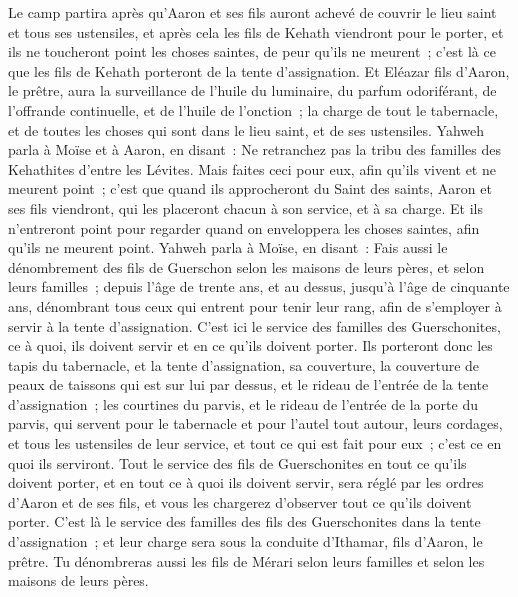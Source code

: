 \begin{multicols}{2}
Le camp partira après qu'Aaron et ses fils auront achevé de couvrir le lieu saint et tous ses ustensiles, et après cela les fils de Kehath viendront pour le porter, et ils ne toucheront point les choses saintes, de peur qu'ils ne meurent~; c'est là ce que les fils de Kehath porteront de la tente d'assignation.
Et Eléazar fils d'Aaron, le prêtre, aura la surveillance de l'huile du luminaire, du parfum odoriférant, de l'offrande continuelle, et de l'huile de l'onction~; la charge de tout le tabernacle, et de toutes les choses qui sont dans le lieu saint, et de ses ustensiles.
Yahweh parla à Moïse et à Aaron, en disant~:
Ne retranchez pas la tribu des familles des Kehathites d'entre les Lévites.
Mais faites ceci pour eux, afin qu'ils vivent et ne meurent point~; c'est que quand ils approcheront du Saint des saints, Aaron et ses fils viendront, qui les placeront chacun à son service, et à sa charge.
Et ils n'entreront point pour regarder quand on enveloppera les choses saintes, afin qu'ils ne meurent point.
Yahweh parla à Moïse, en disant~:
Fais aussi le dénombrement des fils de Guerschon selon les maisons de leurs pères, et selon leurs familles~;
depuis l'âge de trente ans, et au dessus, jusqu'à l'âge de cinquante ans, dénombrant tous ceux qui entrent pour tenir leur rang, afin de s'employer à servir à la tente d'assignation.
C'est ici le service des familles des Guerschonites, ce à quoi, ils doivent servir et en ce qu'ils doivent porter.
Ils porteront donc les tapis du tabernacle, et la tente d'assignation, sa couverture, la couverture de peaux de taissons qui est sur lui par dessus, et le rideau de l'entrée de la tente d'assignation~;
les courtines du parvis, et le rideau de l'entrée de la porte du parvis, qui servent pour le tabernacle et pour l'autel tout autour, leurs cordages, et tous les ustensiles de leur service, et tout ce qui est fait pour eux~; c'est ce en quoi ils serviront.
Tout le service des fils de Guerschonites en tout ce qu'ils doivent porter, et en tout ce à quoi ils doivent servir, sera réglé par les ordres d'Aaron et de ses fils, et vous les chargerez d'observer tout ce qu'ils doivent porter.
C'est là le service des familles des fils des Guerschonites dans la tente d'assignation~; et leur charge sera sous la conduite d'Ithamar, fils d'Aaron, le prêtre.
Tu dénombreras aussi les fils de Mérari selon leurs familles et selon les maisons de leurs pères.

\end{multicols}
